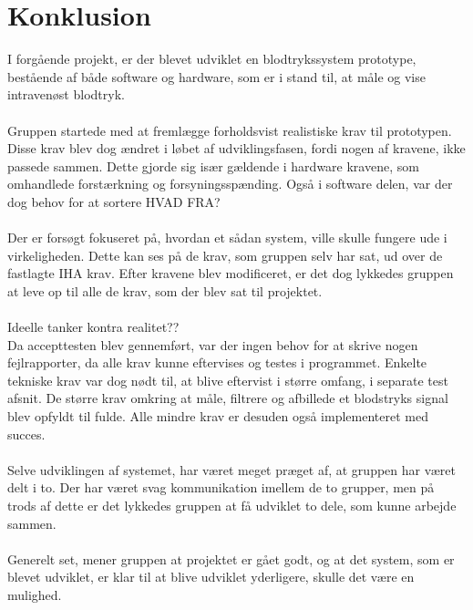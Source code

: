 \chapter{Konklusion}
I forgående projekt, er der blevet udviklet en blodtrykssystem prototype, bestående af både software og hardware, som er i stand til, at måle og vise intravenøst blodtryk. \\
\\
Gruppen startede med at fremlægge forholdsvist realistiske krav til prototypen. Disse krav blev dog ændret i løbet af udviklingsfasen, fordi nogen af kravene, ikke passede sammen. Dette gjorde sig især gældende i hardware kravene, som omhandlede forstærkning og forsyningsspænding. Også i software delen, var der dog behov for at sortere HVAD FRA?  \\
\\
Der er forsøgt fokuseret på, hvordan et sådan system, ville skulle fungere ude i virkeligheden. Dette kan ses på de krav, som gruppen selv har sat, ud over de fastlagte IHA krav. Efter kravene blev modificeret, er det dog lykkedes gruppen at leve op til alle de krav, som der blev sat til projektet. \\
\\Ideelle tanker kontra realitet??
\\
Da accepttesten blev gennemført, var der ingen behov for at skrive nogen fejlrapporter, da alle krav kunne eftervises og testes i programmet. Enkelte tekniske krav var dog nødt til, at blive eftervist i større omfang, i separate test afsnit. De større krav omkring at måle, filtrere og afbillede et blodstryks signal blev opfyldt til fulde. Alle mindre krav er desuden også implementeret med succes. \\
\\
Selve udviklingen af systemet, har været meget præget af, at gruppen har været delt i to. Der har været svag kommunikation imellem de to grupper, men på trods af dette er det lykkedes gruppen at få udviklet to dele, som kunne arbejde sammen. \\
\\
Generelt set, mener gruppen at projektet er gået godt, og at det system, som er blevet udviklet, er klar til at blive udviklet yderligere, skulle det være en mulighed. \\
\\
